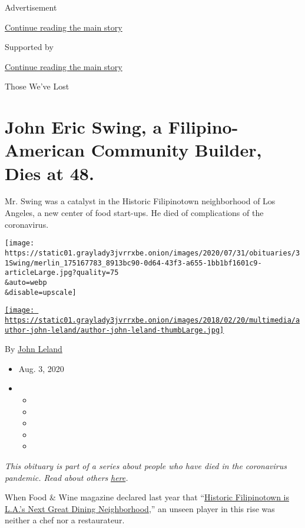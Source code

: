 Advertisement

\protect\hyperlink{after-top}{Continue reading the main story}

Supported by

\protect\hyperlink{after-sponsor}{Continue reading the main story}

Those We've Lost

\hypertarget{john-eric-swing-a-filipino-american-community-builder-dies-at-48}{%
\section{John Eric Swing, a Filipino-American Community Builder, Dies at
48.}\label{john-eric-swing-a-filipino-american-community-builder-dies-at-48}}

Mr. Swing was a catalyst in the Historic Filipinotown neighborhood of
Los Angeles, a new center of food start-ups. He died of complications of
the coronavirus.

\texttt{[image: https://static01.graylady3jvrrxbe.onion/images/2020/07/31/obituaries/31Swing/merlin\_175167783\_8913bc90-0d64-43f3-a655-1bb1bf1601c9-articleLarge.jpg?quality=75\\\&auto=webp\\\&disable=upscale]}

\href{https://www.nytimes3xbfgragh.onion/by/john-leland}{\texttt{[image: https://static01.graylady3jvrrxbe.onion/images/2018/02/20/multimedia/author-john-leland/author-john-leland-thumbLarge.jpg]}}

By \href{https://www.nytimes3xbfgragh.onion/by/john-leland}{John Leland}

\begin{itemize}
\item
  Aug. 3, 2020
\item
  \begin{itemize}
  \item
  \item
  \item
  \item
  \item
  \end{itemize}
\end{itemize}

\emph{This obituary is part of a series about people who have died in
the coronavirus pandemic. Read about others}
\href{https://www.nytimes3xbfgragh.onion/interactive/2020/obituaries/people-died-coronavirus-obituaries.html}{\emph{here}}\emph{.}

When Food \& Wine magazine declared last year that
``\href{https://www.foodandwine.com/travel/restaurants/historic-filipinotown-restaurants-los-angeles}{Historic
Filipinotown is L.A.'s Next Great Dining Neighborhood},'' an unseen
player in this rise was neither a chef nor a restaurateur.

